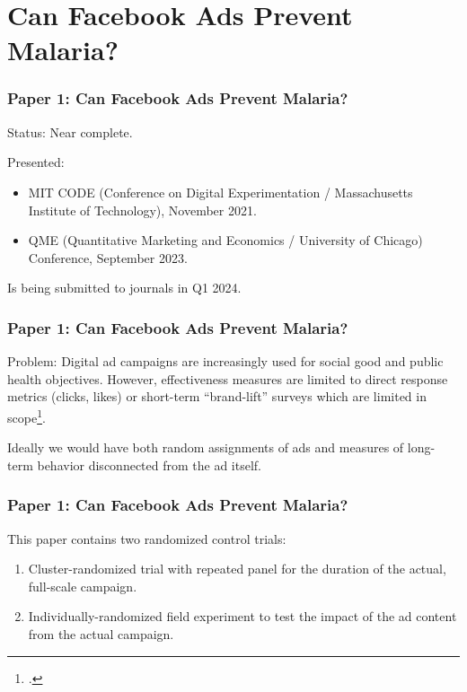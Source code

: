\documentclass[aspectratio=169]{beamer}
\begin{document}
\section{Can Facebook Ads Prevent Malaria?}
\begin{frame}
\frametitle{Paper 1: Can Facebook Ads Prevent Malaria?}

Status: Near complete. 

Presented: 

\begin{itemize}
\item MIT CODE (Conference on Digital Experimentation / Massachusetts Institute of Technology), November 2021.
\item QME (Quantitative Marketing and Economics / University of Chicago) Conference, September 2023. 
\end{itemize}

Is being submitted to journals in Q1 2024. 

\end{frame}

\begin{frame}
\frametitle{Paper 1: Can Facebook Ads Prevent Malaria?}

Problem: Digital ad campaigns are increasingly used for social good and public health objectives. However, effectiveness measures are limited to direct response metrics (clicks, likes) or short-term ``brand-lift'' surveys which are limited in scope\footcite{Shawky2019,atheycovid2023}. 

Ideally we would have both random assignments of ads and measures of long-term behavior disconnected from the ad itself. 
  
\end{frame}


\begin{frame}
\frametitle{Paper 1: Can Facebook Ads Prevent Malaria?}

This paper contains two randomized control trials: 

\begin{enumerate}
\item Cluster-randomized trial with repeated panel for the duration of the actual, full-scale campaign. 
\item Individually-randomized field experiment to test the impact of the ad content from the actual campaign. 
\end{enumerate}
  
\end{frame}
\end{document}
